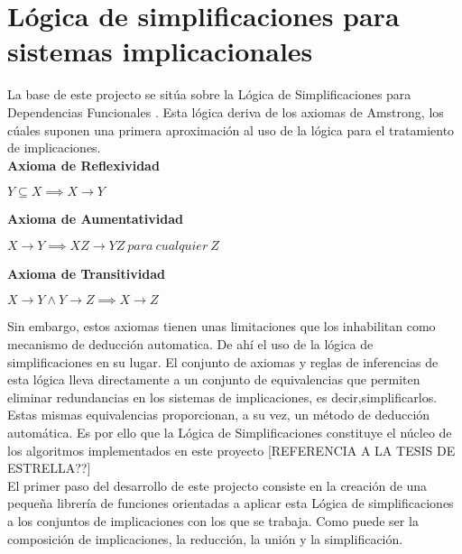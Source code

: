 \section{L\'ogica de simplificaciones para sistemas implicacionales}


La base de este projecto se sit\'ua sobre la L\'ogica de Simplificaciones para Dependencias Funcionales \cite{Cordero2002}. Esta l\'ogica deriva de los axiomas de Amstrong, los c\'uales suponen una primera aproximaci\'on al uso de la l\'ogica para el tratamiento de implicaciones.\\

\textbf{Axioma de Reflexividad}

\begin{center}
    \(Y \subseteq X \implies X \to Y \)
\end{center}

\textbf{Axioma de Aumentatividad}

\begin{center}
    \(X \to Y \implies XZ \to YZ \ para \ cualquier \ Z \)
\end{center}

\textbf{Axioma de Transitividad}

\begin{center}
    \(X \to Y \wedge Y \to Z \implies X \to Z \)
\end{center}

Sin embargo, estos axiomas tienen unas limitaciones que los inhabilitan como mecanismo de deducci\'on automatica. De ah\'i el uso de la l\'ogica de simplificaciones en su lugar. El conjunto de axiomas y reglas de inferencias de esta l\'ogica lleva directamente a un conjunto de equivalencias que permiten eliminar redundancias en los sistemas de implicaciones, es decir,simplificarlos. Estas mismas equivalencias proporcionan, a su vez, un m\'etodo de deducci\'on autom\'atica. Es por ello que la L\'ogica de Simplificaciones constituye el n\'ucleo de los algoritmos implementados en este proyecto [REFERENCIA A LA TESIS DE ESTRELLA??]\\




El primer paso del desarrollo de este projecto consiste en la creaci\'on de una peque\~na librer\'ia de funciones
orientadas a aplicar esta L\'ogica de simplificaciones a los conjuntos de implicaciones con los que se trabaja. Como 
puede ser la composici\'on de implicaciones, la reducci\'on, la uni\'on y la simplificaci\'on.

